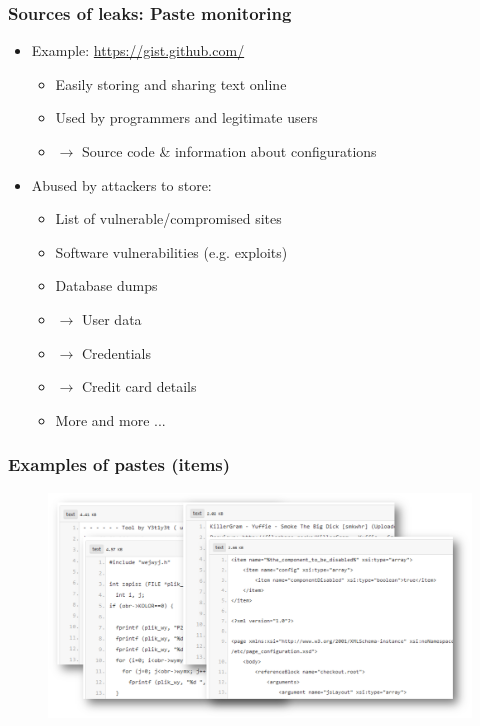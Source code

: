 \documentclass{beamer}
\begin{document}
\begin{frame}
    \frametitle{Sources of leaks: Paste monitoring}
    \begin{itemize}
        \item Example: \url{https://gist.github.com/}
            \begin{itemize}
                \item Easily storing and sharing text online
                \item Used by programmers and legitimate users
                \item[] $\to$ Source code \& information about configurations
            \end{itemize}
        \pause
        \item Abused by attackers to store:
            \begin{itemize}
                \item List of vulnerable/compromised sites
                \item Software vulnerabilities (e.g. exploits)
                \item Database dumps
                \item[] $\to$ User data
                \item[] $\to$ Credentials
                \item[] $\to$ Credit card details
                \item More and more ...
            \end{itemize}
    \end{itemize}
\end{frame}

\begin{frame}[t,plain]
        \frametitle{Examples of pastes (items)}
    \begin{figure}
        \includegraphics[scale=0.32, angle=0]{images/pastes-ex.png}
    \end{figure}
\end{frame}
\end{document}
